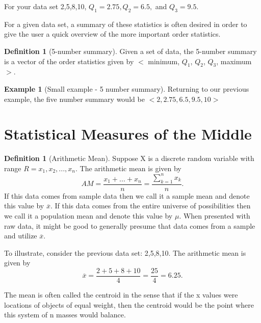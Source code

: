 \documentclass[10pt,]{book}
\theoremstyle{plain}
\theoremstyle{definition}
\newtheorem{definition}[theorem]{Definition}
\theoremstyle{definition}
\newtheorem{example}[theorem]{Example}
\theoremstyle{definition}
\numberwithin{equation}{section}
\newcommand{\lt}{ < }
\newcommand{\gt}{ > }
\begin{document}
	For your data set {2,5,8,10}, 
	\(Q_1 = 2.75, Q_2 = 6.5,\) and \(Q_3 = 9.5\).
\par

	For a given data set, a summary of these statistics is often desired in order to give the user a quick overview of the more important order statistics.
\begin{definition}[{5-number summary}]\label{definition-6}
Given a set of data, the 5-number summary is a vector of the order statistics given by \(\lt\) minimum, \(Q_1\), \(Q_2\), \(Q_3\), maximum \(\gt\). 
\end{definition}
\begin{example}[Small example - 5 number summary]\label{example-4}
Returning to our previous example, the five number summary would be
	\(\lt 2, 2.75, 6.5, 9.5, 10 \gt\)
\end{example}
\typeout{************************************************}
\typeout{************************************************}
\section[{Statistical Measures of the Middle}]{Statistical Measures of the Middle}\label{section-4}
\begin{definition}[{Arithmetic Mean}]\label{definition-7}
Suppose X is a discrete random variable with range 
	\(R = {x_1, x_2, ..., x_n}\). 
	The arithmetic mean is given by
		\begin{equation*}
		AM = \frac{x_1 + ... + x_n}{n} = \frac{\sum_{k=1}^n x_k}{n}.
		\end{equation*}
	If this data comes from sample data then we call it a sample mean and denote this value by \(\overline{x}\). If this data comes from the entire universe of possibilities then we call it a population mean and denote this value by \(\mu\).  When presented with raw data, it might be good to generally presume that data comes from a sample and utilize \(\overline{x}\).%
\end{definition}

	To illustrate, consider the previous data set: {2,5,8,10}. The arithmetic mean is given by
	\begin{equation*}\overline{x} = \frac{2+5+8+10}{4} = \frac{25}{4} = 6.25.\end{equation*}
\par

	The mean is often called the centroid in the sense that if the x values were locations of objects of equal weight, then the centroid
	would be the point where this system of n masses would balance. 
\par
\end{document}
